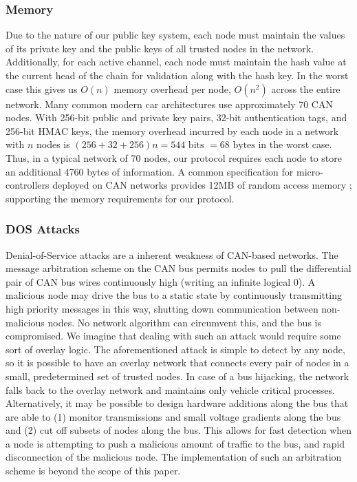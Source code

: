 \documentclass{article}
\begin{document}
    \subsubsection{Memory}
    Due to the nature of our public key system, each node must maintain the values of its private key and the public keys of all trusted nodes in the network. Additionally, for each active channel, each node must maintain the hash value at the current head of the chain for validation along with the hash key. In the worst case this gives us $O(n)$ memory overhead per node, $O(n^2)$ across the entire network. Many common modern car architectures use  approximately 70 CAN nodes. With 256-bit public and private key pairs, 32-bit authentication tags, and 256-bit HMAC keys, the memory overhead incurred by each node in a network with $n$ nodes is $(256+32+256)n = 544\text{ bits }= 68\text{ bytes}$ in the worst case. Thus, in a typical network of 70 nodes, our protocol requires each node to store an additional 4760 bytes of information. A common specification for micro-controllers deployed on CAN networks provides 12MB of random access memory \cite{analog2002}; supporting the memory requirements for our protocol.
    
    \subsubsection{DOS Attacks} Denial-of-Service attacks are a inherent weakness of CAN-based networks. The message arbitration scheme on the CAN bus permits nodes to pull the differential pair of CAN bus wires continuously high (writing an infinite logical 0). A malicious node may drive the bus to a static state by continuously transmitting high priority messages in this way, shutting down communication between non-malicious nodes. No network algorithm can circumvent this, and the bus is compromised. We imagine that dealing with such an attack would require some sort of overlay logic. The aforementioned attack is simple to detect by any node, so it is possible to have an overlay network that connects every pair of nodes in a small, predetermined set of trusted nodes. In case of a bus hijacking, the network falls back to the overlay network and maintains only vehicle critical processes. Alternatively, it may be possible to design hardware additions along the bus that are able to (1) monitor transmissions and small voltage gradients along the bus and (2) cut off subsets of nodes along the bus. This allows for fast detection when a node is attempting to push a malicious amount of traffic to the bus, and rapid disconnection of the malicious node. The implementation of such an arbitration scheme is beyond the scope of this paper. \\
    
\end{document}
